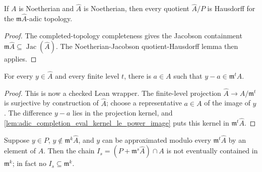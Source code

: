 \begin{lemma}
  \label{lem:adic_completion_quotient_hausdorff_of_noetherian_completion}
  If \(A\) is Noetherian and \(\widehat A\) is Noetherian, then every
  quotient \(\widehat A/P\) is Hausdorff for the
  \(\mathfrak m\widehat A\)-adic topology.
\end{lemma}

\begin{proof}
  The completed-topology completeness gives the Jacobson containment
  \(\mathfrak m\widehat A\subseteq\operatorname{Jac}(\widehat A)\).  The
  Noetherian-Jacobson quotient-Hausdorff lemma then applies.
\end{proof}

\begin{lemma}
  \label{lem:adic_completion_exists_approx_mod_power_image}
  For every \(y\in\widehat A\) and every finite level \(t\), there is
  \(a\in A\) such that
  \(y-a\in \mathfrak m^t\widehat A\).
\end{lemma}

\begin{proof}
  This is now a checked Lean wrapper.  The finite-level projection
  \(\widehat A\to A/\mathfrak m^t\) is surjective by construction of
  \(\widehat A\); choose a representative \(a\in A\) of the image of
  \(y\).  The difference \(y-a\) lies in the projection kernel, and
  \cref{lem:adic_completion_eval_kernel_le_power_image} puts this kernel in
  \(\mathfrak m^t\widehat A\).
\end{proof}

\begin{lemma}
  \label{lem:bad_prime_contraction_chain_avoids_fixed_power_of_element}
  Suppose \(y\in P\), \(y\notin\mathfrak m^k\widehat A\), and \(y\) can be
  approximated modulo every \(\mathfrak m^t\widehat A\) by an element of
  \(A\).  Then the chain
  \(I_s=(P+\mathfrak m^s\widehat A)\cap A\) is not eventually contained in
  \(\mathfrak m^k\); in fact no \(I_s\subseteq\mathfrak m^k\).
\end{lemma}

